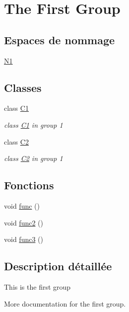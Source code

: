 \hypertarget{group__group1}{}\section{The First Group}
\label{group__group1}
\subsection*{Espaces de nommage}
\begin{DoxyCompactItemize}
\item 
 \hyperlink{namespace_n1}{N1}
\end{DoxyCompactItemize}
\subsection*{Classes}
\begin{DoxyCompactItemize}
\item 
class \hyperlink{class_c1}{C1}
\begin{DoxyCompactList}\small\item\em class \hyperlink{class_c1}{C1} in group 1 \end{DoxyCompactList}\item 
class \hyperlink{class_c2}{C2}
\begin{DoxyCompactList}\small\item\em class \hyperlink{class_c2}{C2} in group 1 \end{DoxyCompactList}\end{DoxyCompactItemize}
\subsection*{Fonctions}
\begin{DoxyCompactItemize}
\item 
void \hyperlink{group__group1_ga24f647174760cac13d2624b5ad74b00c}{func} ()
\item 
void \hyperlink{group__group1_ga053929c0809a5f56f7548fd7d9968f31}{func2} ()
\item 
void \hyperlink{group__group1_gadbf675591ff057ec48ce35b0d5cdf755}{func3} ()
\end{DoxyCompactItemize}


\subsection{Description détaillée}
This is the first group

More documentation for the first group. 

